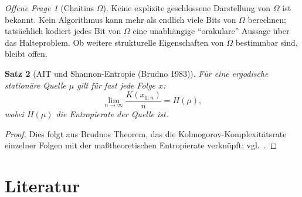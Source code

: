 \documentclass[12pt,a4paper]{amsart}
\newtheorem{theorem}{Satz}[section]
\theoremstyle{definition}
\theoremstyle{remark}
\newtheorem{offenefrage}[theorem]{Offene Frage}
\begin{document}
\begin{offenefrage}[Chaitins $\Omega$]
Keine explizite geschlossene Darstellung von $\Omega$ ist bekannt. Kein Algorithmus
kann mehr als endlich viele Bits von $\Omega$ berechnen; tatsächlich kodiert jedes
Bit von $\Omega$ eine unabhängige ``orakulare'' Aussage über das Halteproblem.
Ob weitere strukturelle Eigenschaften von $\Omega$ bestimmbar sind, bleibt offen.
\end{offenefrage}

\begin{theorem}[AIT und Shannon-Entropie (Brudno 1983)]
Für eine ergodische stationäre Quelle $\mu$ gilt für fast jede Folge $x$:
\[
  \lim_{n\to\infty} \frac{K(x_{1:n})}{n} = H(\mu),
\]
wobei $H(\mu)$ die Entropierate der Quelle ist.
\end{theorem}
\begin{proof}
Dies folgt aus Brudnos Theorem, das die Kolmogorov-Komplexitätsrate einzelner
Folgen mit der maßtheoretischen Entropierate verknüpft; vgl.\ \cite{CoverThomas2006}.
\end{proof}

\section{Literatur}
\end{document}
